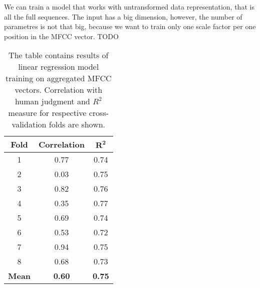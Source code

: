 \par
We can train a model that works with untransformed data representation, that is all the full sequences. The input has a big dimension, however, the number of parametres is not that big, because we want to train only one scale factor per one position in the MFCC vector. TODO
\begin{table}
\begin{center}
\begin{tabular}{ |c|c|c| } 
 \hline
 \textbf{Fold} & \textbf{Correlation} & $\boldsymbol{R^2}$ \\ \hline
 1 & 0.77 & 0.74 \\ \hline
 2 & 0.03 & 0.75 \\ \hline
 3 & 0.82 & 0.76 \\ \hline
 4 & 0.35 & 0.77 \\ \hline
 5 & 0.69 & 0.74 \\ \hline
 6 & 0.53 & 0.72 \\ \hline
 7 & 0.94 & 0.75 \\ \hline
 8 & 0.68 & 0.73 \\ \hline
 \textbf{Mean} & \textbf{0.60} & \textbf{0.75} \\ \hline
 
 \end{tabular}
\end{center}
\label{cv}
\caption{The table contains results of linear regression model training on aggregated MFCC vectors. Correlation with human judgment and $R^2$ measure for respective cross-validation folds are shown.}
\end{table}
